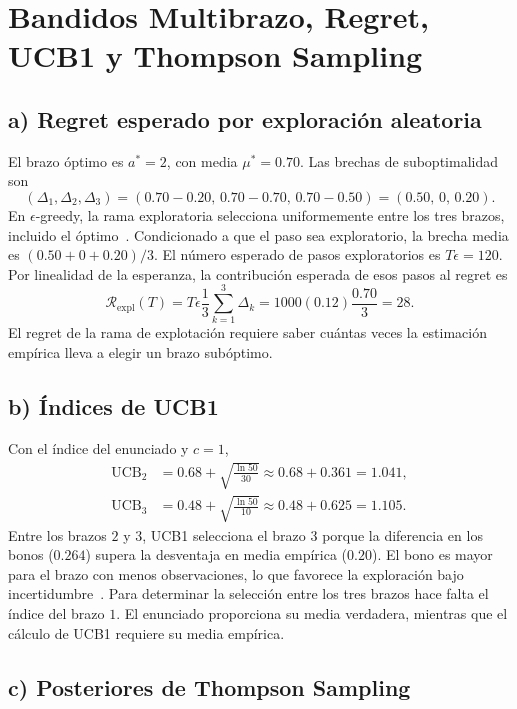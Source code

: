 \section{Bandidos Multibrazo, Regret, UCB1 y Thompson Sampling}

\subsection*{a) Regret esperado por exploración aleatoria}

El brazo óptimo es $a^*=2$, con media $\mu^*=0.70$. Las brechas de
suboptimalidad son
\[
    (\Delta_1,\Delta_2,\Delta_3)
    =(0.70-0.20,\,0.70-0.70,\,0.70-0.50)
    =(0.50,\,0,\,0.20).
\]
En $\epsilon$-greedy, la rama exploratoria selecciona uniformemente
entre los tres brazos, incluido el óptimo~\cite[cap.~2]{sutton}.
Condicionado a que el paso sea exploratorio, la brecha media es
$(0.50+0+0.20)/3$. El número esperado de pasos exploratorios es
$T\epsilon=120$. Por linealidad de la esperanza, la contribución
esperada de esos pasos al regret es
\[
    \mathcal{R}_{\mathrm{expl}}(T)
    =T\epsilon\frac{1}{3}\sum_{k=1}^3\Delta_k
    =1000(0.12)\frac{0.70}{3}
    =\boxed{28}.
\]
El regret de la rama de explotación requiere saber cuántas veces la
estimación empírica lleva a elegir un brazo subóptimo.

\subsection*{b) Índices de UCB1}

Con el índice del enunciado y $c=1$,
\begin{align*}
    \mathrm{UCB}_2
    &=0.68+\sqrt{\frac{\ln 50}{30}}
      \approx 0.68+0.361=1.041,\\
    \mathrm{UCB}_3
    &=0.48+\sqrt{\frac{\ln 50}{10}}
      \approx 0.48+0.625=1.105.
\end{align*}
Entre los brazos $2$ y $3$, UCB1 selecciona el brazo $3$ porque la
diferencia en los bonos ($0.264$) supera la desventaja en media
empírica ($0.20$). El bono es mayor para el brazo con menos
observaciones, lo que favorece la exploración bajo
incertidumbre~\cite[cap.~7]{lattimore2020}. Para determinar la
selección entre los tres brazos hace falta el índice del brazo $1$.
El enunciado proporciona su media verdadera, mientras que el cálculo
de UCB1 requiere su media empírica.

\subsection*{c) Posteriores de Thompson Sampling}


